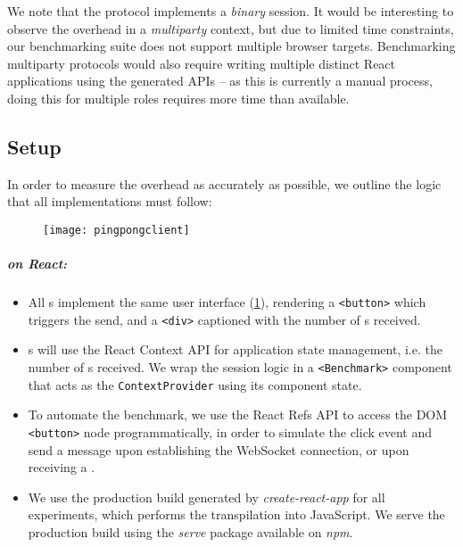 We note that the  protocol 
implements a \textit{binary} session. 
It would be interesting to observe the overhead in a \textit{multiparty}
context, but due to limited time constraints,
our benchmarking suite does not support multiple browser targets.
Benchmarking multiparty protocols would also require writing multiple
distinct React applications using the generated APIs -- as this is currently
a manual process, doing this for multiple roles requires more time than
available.

\subsection{Setup}

In order to measure the overhead as accurately as possible,
we outline the logic that all implementations must follow:

\begin{figure}[!ht]
\centering
\texttt{[image: pingpongclient]}
\label{fig:pingpongclient}
\end{figure}

\subparagraph{  on React:}
\begin{itemize}

\item All s implement the same user interface 
(\cref{fig:pingpongclient}), rendering
a \texttt{<button>} which triggers the send, and
a \texttt{<div>} captioned with the number of s received.

\item {}s will use the React Context API \cite{reactcontext}
for application state management, i.e. the number of s received. 
We wrap the session logic in a \texttt{<Benchmark>} component 
that acts as the \texttt{ContextProvider} using its component state.

\item To automate the benchmark, we use the React Refs API \cite{reactrefs}
to access the DOM \texttt{<button>} node programmatically, in order to
simulate the click event and send a  message upon establishing
the WebSocket connection, or upon receiving a .

\item We use the production build generated by 
\textit{create-react-app} \cite{cra} for all experiments, which performs the
transpilation into JavaScript. We serve the production build using the
\textit{serve} package \cite{npmserve} available on \textit{npm}.

\end{itemize}

